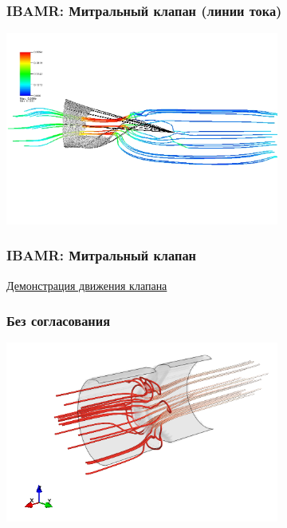 \documentclass[14pt]{beamer}
\begin{document}
\begin{frame}
\frametitle{IBAMR: Митральный клапан (линии тока)}
    \begin{center}
    \includegraphics[width=9cm]{immersed_boundary/MV_streamline_0030.jpeg}
    \end{center}
\end{frame}

\begin{frame}
\frametitle{IBAMR: Митральный клапан}
    \begin{center}
        \href{run:video/MV\_side.mov}{Демонстрация движения клапана}
    \end{center}
\end{frame}

\begin{frame}
\frametitle{Без согласования}
    \begin{center}
    \includegraphics[width=9cm]{images/valves_resized_with_bound.png}
    \end{center}
\end{frame}
\end{document}
